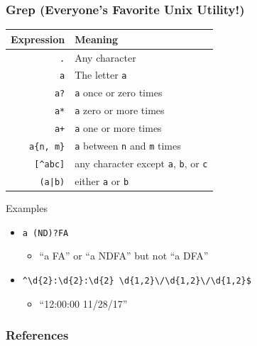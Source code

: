 \documentclass[11 pt]{beamer}
\begin{document}
\begin{frame}[fragile]
	\frametitle{Grep (Everyone's Favorite Unix Utility!)}
	\vspace{-3 ex}
	\begin{center}
		{\small
		\begin{tabular}{|r l|}
			\hline
			\textbf{Expression} 	& \textbf{Meaning} \\
				\hline
				\verb!.! 			& Any character \\
				\verb!a! 			& The letter \verb!a! \\
				\verb!a?! 			& \verb!a! once or zero times \\
				\verb!a*! 			& \verb!a! zero or more times \\
				\verb!a+! 			& \verb!a! one or more times \\
				\verb!a{n, m}! 	& \verb!a! between \verb!n! and \verb!m! times \\
				\verb![^abc]! 		& any character except \verb!a!, \verb!b!, or \verb!c! \\
				\verb!(a|b)! 		& either \verb!a! or \verb!b! \\
			\hline
		\end{tabular}
		}
	\end{center}
	\begin{block}{Examples}
	\vspace{-3 ex}
		\begin{itemize}
			\item[] \verb!a (ND)?FA!
			\begin{itemize}
				\item[] ``a FA'' or ``a NDFA'' but not ``a DFA''
			\end{itemize}
			\item[] \verb!^\d{2}:\d{2}:\d{2} \d{1,2}\/\d{1,2}\/\d{1,2}$! 
			\begin{itemize}
				\item[] ``12:00:00 11/28/17''
			\end{itemize}
		\end{itemize}
	\end{block}
\end{frame}

\begin{frame}[shrink]
	\frametitle{References}
	
	\nocite{*}
	
\end{frame}
\end{document}
